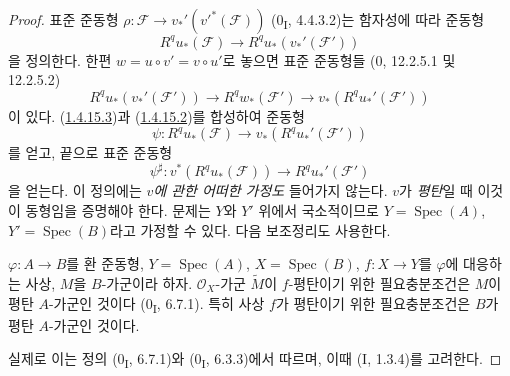 \begin{proof}
표준 준동형
$\rho:\mathcal F\to v_*'(v'^*(\mathcal F))$
(0\textsubscript{I}, 4.4.3.2)는 함자성에 따라 준동형
\begin{equation}
\label{III.1.4.15.2-fr}
\tag{1.4.15.2}
R^qu_*(\mathcal F)\longrightarrow R^qu_*(v_*'(\mathcal F'))
\end{equation}
을 정의한다. 한편 $w=u\circ v'=v\circ u'$로 놓으면 표준 준동형들
(0, 12.2.5.1 및 12.2.5.2)
\begin{equation}
\label{III.1.4.15.3-fr}
\tag{1.4.15.3}
R^qu_*(v_*'(\mathcal F'))\longrightarrow R^qw_*(\mathcal F')
\longrightarrow v_*(R^qu_*'(\mathcal F'))
\end{equation}
이 있다. (\hyperref[III.1.4.15.3-fr]{1.4.15.3})과
(\hyperref[III.1.4.15.2-fr]{1.4.15.2})를 합성하여 준동형
\[
\psi:R^qu_*(\mathcal F)\longrightarrow v_*(R^qu_*'(\mathcal F'))
\]
를 얻고, 끝으로 표준 준동형
\begin{equation}
\label{III.1.4.15.4-fr}
\tag{1.4.15.4}
\psi^\sharp:v^*(R^qu_*(\mathcal F))\longrightarrow R^qu_*'(\mathcal F')
\end{equation}
을 얻는다. 이 정의에는 \emph{$v$에 관한 어떠한 가정도} 들어가지
않는다. $v$가 \emph{평탄}일 때 이것이 동형임을 증명해야 한다.
문제는 $Y$와 $Y'$ 위에서 국소적이므로
$Y=\operatorname{Spec}(A)$, $Y'=\operatorname{Spec}(B)$라고 가정할 수
있다. 다음 보조정리도 사용한다.

\begin{lemma}[1.4.15.5]
\label{III.1.4.15.5-fr}
$\varphi:A\to B$를 환 준동형, $Y=\operatorname{Spec}(A)$,
$X=\operatorname{Spec}(B)$, $f:X\to Y$를 $\varphi$에 대응하는 사상,
$M$을 $B$-가군이라 하자. $\mathcal O_X$-가군 $\widetilde M$이
$f$-평탄이기 위한 필요충분조건은 $M$이 평탄 $A$-가군인 것이다
(0\textsubscript{I}, 6.7.1). 특히 사상 $f$가 평탄이기 위한
필요충분조건은 $B$가 평탄 $A$-가군인 것이다.
\end{lemma}

실제로 이는 정의 (0\textsubscript{I}, 6.7.1)와
(0\textsubscript{I}, 6.3.3)에서 따르며, 이때 (I, 1.3.4)를 고려한다.


\end{proof}
